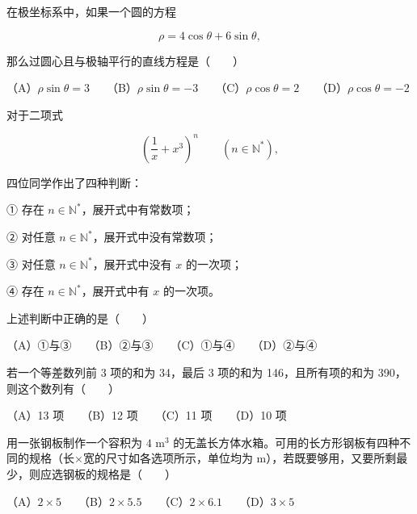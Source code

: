 \begin{question}
在极坐标系中，如果一个圆的方程

\nopagebreak[4]
\[
\rho=4\cos\theta+6\sin\theta,
\]

那么过圆心且与极轴平行的直线方程是\mbox{（　　）}

（A）$\rho\sin\theta=3$　　（B）$\rho\sin\theta=-3$　　（C）$\rho\cos\theta=2$　　（D）$\rho\cos\theta=-2$

\end{question}
\begin{question}
对于二项式

\nopagebreak[4]
\[
\left(\frac1x+x^3\right)^n\qquad(n\in\mathbb N^*),
\]

四位同学作出了四种判断：

① 存在 $n\in\mathbb N^*$，展开式中有常数项；

② 对任意 $n\in\mathbb N^*$，展开式中没有常数项；

③ 对任意 $n\in\mathbb N^*$，展开式中没有 $x$ 的一次项；

④ 存在 $n\in\mathbb N^*$，展开式中有 $x$ 的一次项。

上述判断中正确的是\mbox{（　　）}

（A）①与③　　（B）②与③　　（C）①与④　　（D）②与④

\end{question}
\begin{question}
若一个等差数列前 3 项的和为 34，最后 3 项的和为 146，且所有项的和为 390，则这个数列有\mbox{（　　）}

（A）13 项　　（B）12 项　　（C）11 项　　（D）10 项

\end{question}
\begin{question}
用一张钢板制作一个容积为 $4\text{ m}^3$ 的无盖长方体水箱。可用的长方形钢板有四种不同的规格（长$\times$宽的尺寸如各选项所示，单位均为 m），若既要够用，又要所剩最少，则应选钢板的规格是\mbox{（　　）}

（A）$2\times5$　　（B）$2\times5.5$　　（C）$2\times6.1$　　（D）$3\times5$

\end{question}

